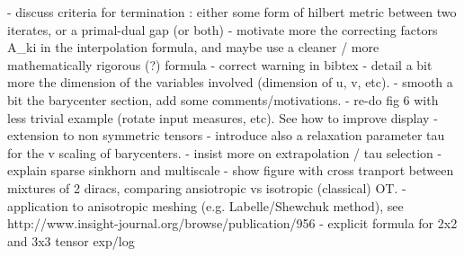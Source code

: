 - discuss criteria for termination : either some form of hilbert metric between two iterates, or a primal-dual gap (or both)
- motivate more the correcting factors A_ki in the interpolation formula, and maybe use a cleaner / more mathematically rigorous (?) formula 
- correct warning in bibtex
- detail a bit more the dimension of the variables involved (dimension of u, v, etc).
- smooth a bit the barycenter section, add some comments/motivations.
- re-do fig 6 with less trivial example (rotate input measures, etc). See how to improve display 
- extension to non symmetric tensors
- introduce also a relaxation parameter tau for the v scaling of barycenters.
- insist more on extrapolation / tau selection 
- explain sparse sinkhorn and multiscale
- show figure with cross tranport between mixtures of 2 diracs, comparing ansiotropic vs isotropic (classical) OT. 
- application to anisotropic meshing  (e.g. Labelle/Shewchuk method), see http://www.insight-journal.org/browse/publication/956
- explicit formula for 2x2 and 3x3 tensor exp/log